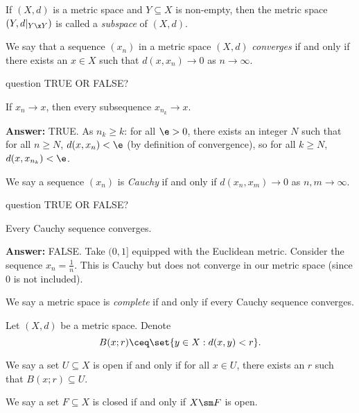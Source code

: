 \documentclass[class=article, crop=false]{standalone}
\begin{document}
\begin{defn}
  If $(X,d)$ is a metric space and $Y \subseteq X$ is non-empty, then the metric space $(Y, d|_{Y\x Y})$ is called a \emph{subspace} of $(X,d)$.
\end{defn}

\begin{defn}
  We say that a sequence $(x_n)$ in a metric space $(X,d)$ \emph{converges} if and only if there exists an $x \in X$ such that $d(x,x_n) \to 0$ as $n\to \infty$.
\end{defn}

\begin{understandingcheck}{question}
  TRUE OR FALSE?

  If $x_n \to x$, then every subsequence $x_{n_k} \to x$.

  \textbf{Answer:} TRUE. As $n_k \geq k$: for all $\e > 0$, there exists an integer $N$ such that for all $n \geq N$, $d(x,x_n) < \e$ (by definition of convergence), so for all $k \geq N$, $d(x,x_{n_k}) < \e$.
\end{understandingcheck}

\begin{defn}
  We say a sequence $(x_n)$ is \emph{Cauchy} if and only if $d(x_n,x_m) \to 0$ as $n,m\to \infty$.
\end{defn}

\begin{understandingcheck}{question}
  TRUE OR FALSE?

  Every Cauchy sequence converges.

  \textbf{Answer:} FALSE. Take $(0,1]$ equipped with the Euclidean metric. Consider the sequence $x_n = \frac{1}{n}$. This is Cauchy but does not converge in our metric space (since $0$ is not included).
\end{understandingcheck}

\begin{defn}
  We say a metric space is \emph{complete} if and only if every Cauchy sequence converges.
\end{defn}

\begin{defn}
  Let $(X,d)$ be a metric space. Denote
    \[
      B(x;r) \ceq \set{y \in X: d(x,y) < r}.
    \]

  We say a set $U \subseteq X$ is open if and only if for all $x \in U$, there exists an $r$ such that $B(x;r) \subseteq U$.

  We say a set $F \subseteq X$ is closed if and only if $X \sm F$ is open.
\end{defn}
\end{document}

